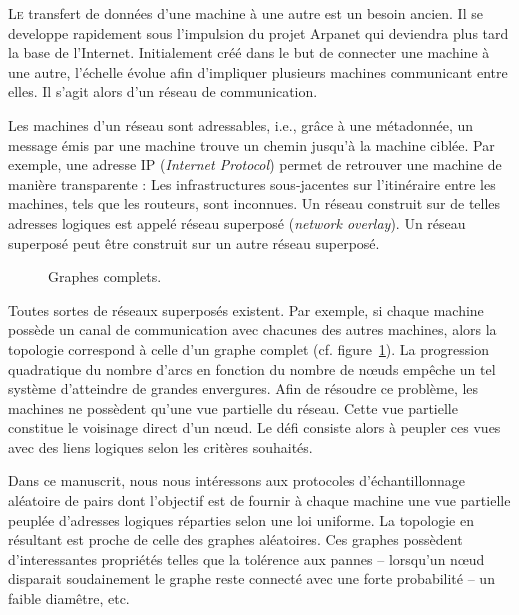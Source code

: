 
\lettrine{L}e transfert de données d'une machine à une autre est un besoin
ancien. Il se developpe rapidement sous l'impulsion du projet Arpanet qui
deviendra plus tard la base de l'Internet. Initialement créé dans le but de
connecter une machine à une autre, l'échelle évolue afin d'impliquer plusieurs
machines communicant entre elles. Il s'agit alors d'un réseau de communication.

Les machines d'un réseau sont adressables, i.e., grâce à une métadonnée, un
message émis par une machine trouve un chemin jusqu'à la machine ciblée. Par
exemple, une adresse IP (\emph{Internet Protocol}) permet de retrouver une
machine de manière transparente : Les infrastructures sous-jacentes sur
l'itinéraire entre les machines, tels que les routeurs, sont inconnues. Un
réseau construit sur de telles adresses logiques est appelé réseau superposé
(\emph{network overlay}). Un réseau superposé peut être construit sur un autre
réseau superposé.

\begin{figure}
  \centering 
  
  \caption{\label{net:fig:completegraph}Graphes complets.}
\end{figure}

Toutes sortes de réseaux superposés existent. Par exemple, si chaque machine
possède un canal de communication avec chacunes des autres machines, alors la
topologie correspond à celle d'un graphe complet
(cf. figure~\ref{net:fig:completegraph}). La progression quadratique du nombre
d'arcs en fonction du nombre de nœuds empêche un tel système d'atteindre de
grandes envergures. Afin de résoudre ce problème, les machines ne possèdent
qu'une vue partielle du réseau. Cette vue partielle constitue le voisinage
direct d'un nœud. Le défi consiste alors à peupler ces vues avec des liens
logiques selon les critères souhaités.

Dans ce manuscrit, nous nous intéressons aux protocoles d'échantillonnage
aléatoire de pairs dont l'objectif est de fournir à chaque machine une vue
partielle peuplée d'adresses logiques réparties selon une loi uniforme. La
topologie en résultant est proche de celle des graphes aléatoires. Ces graphes
possèdent d'interessantes propriétés telles que la tolérence aux pannes --
lorsqu'un nœud disparait soudainement le graphe reste connecté avec une forte
probabilité -- un faible diamêtre, etc.


